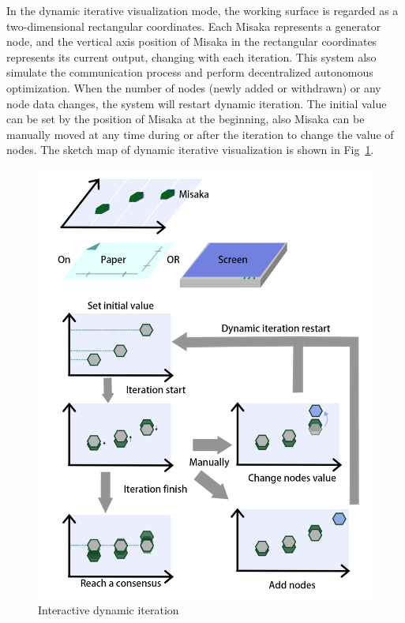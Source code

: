 \documentclass[conference]{IEEEtran}
\begin{document}
In the dynamic iterative visualization mode, the working surface is regarded as a two-dimensional rectangular coordinates. Each Misaka represents a generator node, and the vertical axis position of Misaka in the rectangular coordinates represents its current output, changing with each iteration. This system also simulate the communication process and perform decentralized autonomous optimization. When the number of nodes (newly added or withdrawn) or any node data changes, the system will restart dynamic iteration. The initial value can be set by the position of Misaka at the beginning, also Misaka can be manually moved at any time during or after the iteration to change the value of nodes. The sketch map of dynamic iterative visualization is shown in Fig~\ref{fig:iteration}. 

\begin{figure}[htbp]
    \centering
    \includegraphics[width=\columnwidth]{Iteration.png}
    \caption{Interactive dynamic iteration}
    \label{fig:iteration}
\end{figure}
\end{document}
